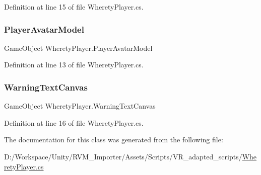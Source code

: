 Definition at line 15 of file Wherety\+Player.\+cs.

\mbox{\label{class_wherety_player_af04135914737331db79932a881d1a41f}} 
\subsubsection{\texorpdfstring{PlayerAvatarModel}{PlayerAvatarModel}}
{\footnotesize\ttfamily Game\+Object Wherety\+Player.\+Player\+Avatar\+Model}



Definition at line 13 of file Wherety\+Player.\+cs.

\mbox{\label{class_wherety_player_a36a7fb7e2dfe289e6fe451b0d0e35a0a}} 
\subsubsection{\texorpdfstring{WarningTextCanvas}{WarningTextCanvas}}
{\footnotesize\ttfamily Game\+Object Wherety\+Player.\+Warning\+Text\+Canvas}



Definition at line 16 of file Wherety\+Player.\+cs.



The documentation for this class was generated from the following file\+:\begin{DoxyCompactItemize}
\item 
D\+:/\+Workspace/\+Unity/\+R\+V\+M\+\_\+\+Importer/\+Assets/\+Scripts/\+V\+R\+\_\+adapted\+\_\+scripts/\mbox{\hyperlink{_wherety_player_8cs}{Wherety\+Player.\+cs}}\end{DoxyCompactItemize}
